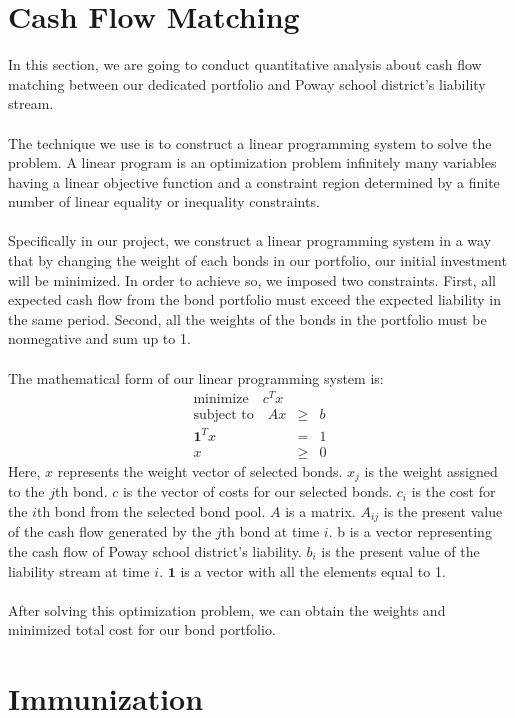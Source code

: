 \documentclass[oneside,12pt]{report}
\begin{document}
{\section{Cash Flow Matching}

In this section, we are going to conduct quantitative analysis about cash flow matching between our dedicated portfolio and Poway school district's liability stream.\\
\\
The technique we use is to construct a linear programming system to solve the problem. A linear program is an optimization problem infinitely many
variables having a linear objective function and a constraint region determined by a finite number of linear equality or
inequality constraints.\\
\\
Specifically in our project, we construct a linear programming system in a way that by changing the weight of each bonds in our portfolio, our initial investment will be minimized. In order to achieve so, we imposed two constraints. First, all expected cash flow from the bond portfolio must exceed the expected liability in the same period. Second, all the weights of the bonds in the portfolio must be nonnegative and sum up to 1.\\
\\
\noindent The mathematical form of our linear programming system is:
\begin{eqnarray*}
\textrm{minimize}\quad    c^T x &   &    \\
\textrm{subject to}\quad  Ax    & \geq& b   \\
                         \mathbf{1}^T x & = & 1\\
                     x     & \geq &0
\end{eqnarray*}
Here, $x$ represents the weight vector of selected bonds. $x_j$ is the weight assigned to the $j$th bond. $c$ is the vector of costs for our selected bonds. $c_i$ is the cost for the $i$th bond from the selected bond pool. $A$ is a matrix. $A_{ij}$ is the present value of the cash flow generated by the $j$th bond at time $i$. b is a vector representing the cash flow of Poway school district's liability. $b_i$ is the present value of the liability stream at time $i$. $\mathbf{1}$ is a vector with all the elements equal to 1. \\
\\
After solving this optimization problem, we can obtain the weights and minimized total cost for our bond portfolio. 
\section{Immunization}

}
\end{document}
